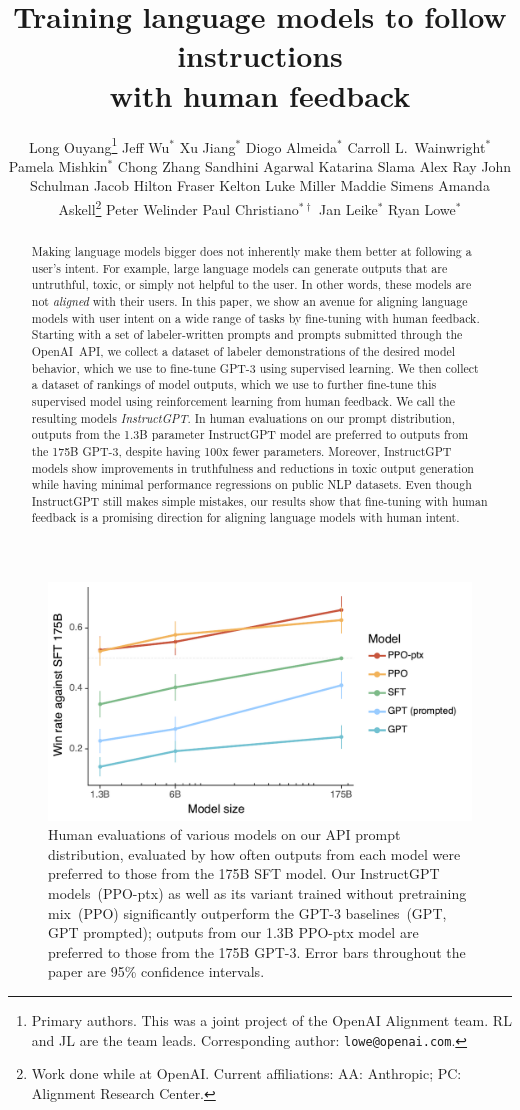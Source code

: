 \documentclass{article}
\title{Training language models to follow instructions\\ with human feedback}
\author{%
  Long Ouyang\thanks{Primary authors. This was a joint project of the OpenAI Alignment team. RL and JL are the team leads. Corresponding author: \texttt{lowe@openai.com}.
  } 
  \And 
  Jeff Wu$^*$
  \And 
  Xu Jiang$^*$  
  \And
  Diogo Almeida$^*$
  \And 
  Carroll L.~Wainwright$^*$
  \And 
  Pamela Mishkin$^*$
  \And 
  Chong Zhang
  \And
  Sandhini Agarwal
  \And
  Katarina Slama
  \And
  Alex Ray
  \And
  John Schulman
  \And
  Jacob Hilton
  \And
  Fraser Kelton
  \And
  Luke Miller
  \And
  Maddie Simens
  \And
  Amanda Askell\thanks{Work done while at OpenAI. Current affiliations: AA: Anthropic; PC: Alignment Research Center.}
  \And
  Peter Welinder
  \And 
  Paul Christiano$^{*\dagger}$
  \AND
  Jan Leike$^*$
  \And
  Ryan Lowe$^*$
  \AND
  \normalfont{OpenAI}
}
\begin{document}
\maketitle





\begin{abstract}
Making language models bigger does not inherently make them better at following a user's intent.
For example, large language models can generate outputs that are untruthful, toxic, or simply not helpful to the user.
In other words, these models are not \emph{aligned} with their users.
In this paper, we show an avenue for aligning language models with user intent on a wide range of tasks by fine-tuning with human feedback.
Starting with a set of labeler-written prompts and prompts submitted through the OpenAI~API, we collect a dataset of labeler demonstrations of the desired model behavior, which we use to fine-tune GPT-3 using supervised learning.
We then collect a dataset of rankings of model outputs, which we use to further fine-tune this supervised model using reinforcement learning from human feedback.
We call the resulting models \emph{InstructGPT}.
In human evaluations on our prompt distribution, outputs from the 1.3B parameter InstructGPT model are preferred to outputs from the 175B {GPT-3}, despite having 100x fewer parameters.
Moreover, InstructGPT models show improvements in truthfulness and reductions in toxic output generation while having minimal performance regressions on public NLP datasets.
Even though InstructGPT still makes simple mistakes, our results show that fine-tuning with human feedback is a promising direction for aligning language models with human intent.
\end{abstract}

\begin{figure}
    \centering
    \includegraphics[width=0.8\linewidth]{figs/main-graph-no-facets.pdf}
    \caption{Human evaluations of various models on our API prompt distribution, evaluated by how often outputs from each model were preferred to those from the 175B SFT model.
    Our InstructGPT models~(PPO-ptx) as well as its variant trained without pretraining mix~(PPO) significantly outperform the GPT-3 baselines~(GPT, GPT prompted); outputs from our 1.3B PPO-ptx model are preferred to those from the 175B GPT-3. Error bars throughout the paper are 95\% confidence intervals.}
    \label{fig:pref_main}
\end{figure}
\end{document}

